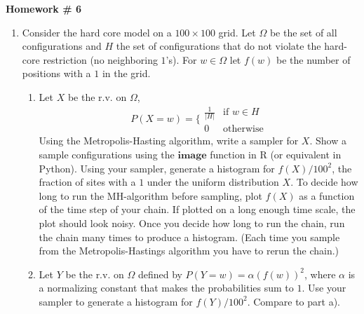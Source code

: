 \documentclass{article}
\begin{document}
\renewcommand{\a}{\textbf{a}}
\renewcommand{\b}{\textbf{b}}
\renewcommand{\d}{\textbf{d}}
\newcommand{\e}{\textbf{e}}

\large

\begin{center}
\textbf{Homework \# 6} \\  
\end{center}

\medskip




\medskip


\newcommand{\normal}{\mathcal{N}}
\newcommand{\eone}{{(\text{1})}}


\begin{enumerate} 



\item Consider the hard core model on a $100 \times 100$ grid.   Let $\Omega$ be the set of all configurations and $H$  the set of configurations that do not violate the hard-core restriction (no neighboring $1$'s).  For $w \in \Omega$ let $f(w)$ be the number of positions with a $1$ in the grid.  
\begin{enumerate}
\item Let $X$ be the r.v. on $\Omega$,
\begin{equation}
P(X=w) = \bigg\{
\begin{array}{cc}
\frac{1}{|H|} & \text{if } w \in H \\
0 & \text{otherwise}
\end{array}
\end{equation}
Using the Metropolis-Hasting algorithm, write a sampler for $X$.  Show a sample configurations using the $\textbf{image}$ function in R (or equivalent in Python).   Using your sampler, generate a histogram for $f(X)/100^2$, the fraction of sites with a $1$ under the uniform distribution $X$.  To decide how long to run the MH-algorithm before sampling, plot $f(X)$ as a function of the time step of your chain.   If plotted on a long enough time scale, the plot should look noisy.   Once you decide how long to run the chain, run the chain many times to produce a histogram.   (Each time you sample from the Metropolis-Hastings algorithm you have to rerun the chain.)
\item Let $Y$ be the r.v. on $\Omega$ defined by $P(Y = w) = \alpha (f(w))^2$, where $\alpha$ is a normalizing constant that makes the probabilities sum to $1$.   Use your sampler to generate a histogram for $f(Y)/100^2$.  Compare to part a).
\end{enumerate}


\end{enumerate}
\end{document}
